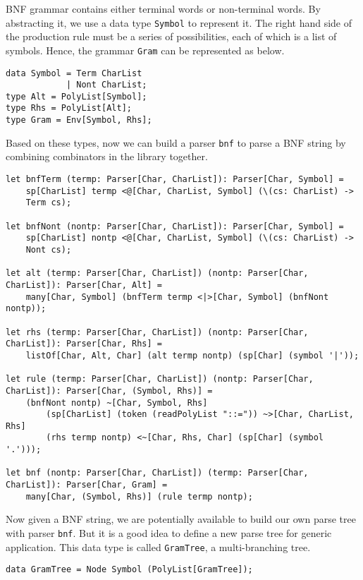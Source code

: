 BNF grammar contains either terminal words or non-terminal words. By abstracting it, we use a data type \texttt{Symbol} to represent it. The right hand side of the production rule must be a series of possibilities, each of which is a list of symbols. Hence, the grammar \texttt{Gram} can be represented as below.

\begin{lstlisting}
data Symbol = Term CharList
            | Nont CharList;
type Alt = PolyList[Symbol];
type Rhs = PolyList[Alt];
type Gram = Env[Symbol, Rhs];
\end{lstlisting}

Based on these types, now we can build a parser \texttt{bnf} to parse a BNF string by combining combinators in the library together.

\begin{lstlisting}
let bnfTerm (termp: Parser[Char, CharList]): Parser[Char, Symbol] =
    sp[CharList] termp <@[Char, CharList, Symbol] (\(cs: CharList) ->
    Term cs);

let bnfNont (nontp: Parser[Char, CharList]): Parser[Char, Symbol] =
    sp[CharList] nontp <@[Char, CharList, Symbol] (\(cs: CharList) ->
    Nont cs);

let alt (termp: Parser[Char, CharList]) (nontp: Parser[Char, CharList]): Parser[Char, Alt] =
    many[Char, Symbol] (bnfTerm termp <|>[Char, Symbol] (bnfNont nontp));

let rhs (termp: Parser[Char, CharList]) (nontp: Parser[Char, CharList]): Parser[Char, Rhs] =
    listOf[Char, Alt, Char] (alt termp nontp) (sp[Char] (symbol '|'));

let rule (termp: Parser[Char, CharList]) (nontp: Parser[Char, CharList]): Parser[Char, (Symbol, Rhs)] =
    (bnfNont nontp) ~[Char, Symbol, Rhs]
        (sp[CharList] (token (readPolyList "::=")) ~>[Char, CharList, Rhs]
        (rhs termp nontp) <~[Char, Rhs, Char] (sp[Char] (symbol '.')));

let bnf (nontp: Parser[Char, CharList]) (termp: Parser[Char, CharList]): Parser[Char, Gram] =
    many[Char, (Symbol, Rhs)] (rule termp nontp);
\end{lstlisting}

Now given a BNF string, we are potentially available to build our own parse tree with parser \texttt{bnf}. But it is a good idea to define a new parse tree for generic application. This data type is called \texttt{GramTree}, a multi-branching tree.

\begin{lstlisting}
data GramTree = Node Symbol (PolyList[GramTree]);
\end{lstlisting}


